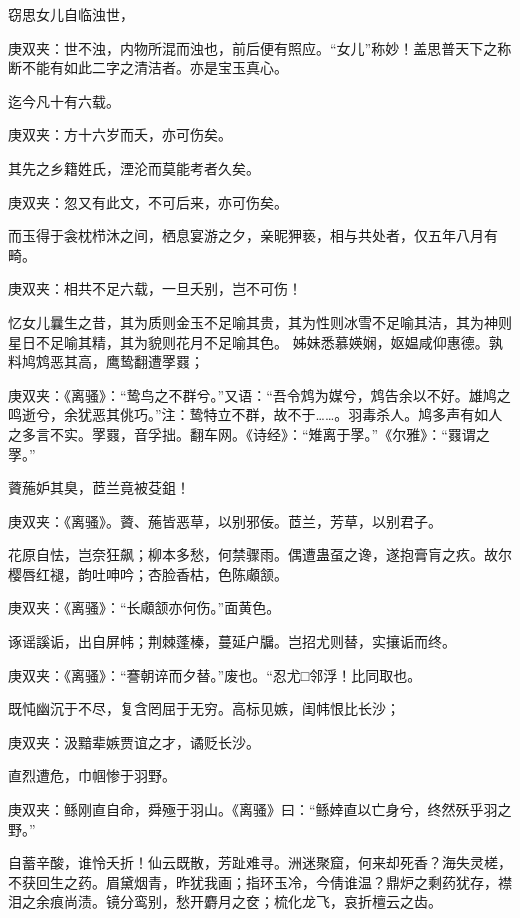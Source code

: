 \begin{qute2sp}
    \begin{parag}
        窃思女儿自临浊世，
        \begin{note}庚双夹：世不浊，内物所混而浊也，前后便有照应。“女儿”称妙！盖思普天下之称断不能有如此二字之清洁者。亦是宝玉真心。\end{note}
        迄今凡十有六载。
        \begin{note}庚双夹：方十六岁而夭，亦可伤矣。\end{note}
        其先之乡籍姓氏，湮沦而莫能考者久矣。
        \begin{note}庚双夹：忽又有此文，不可后来，亦可伤矣。\end{note}
        而玉得于衾枕栉沐之间，栖息宴游之夕，亲昵狎亵，相与共处者，仅五年八月有畸。
        \begin{note}庚双夹：相共不足六载，一旦夭别，岂不可伤！\end{note}
        忆女儿曩生之昔，其为质则金玉不足喻其贵，其为性则冰雪不足喻其洁，其为神则星日不足喻其精，其为貌则花月不足喻其色。
        姊妹悉慕媖娴，妪媪咸仰惠德。孰料鸠鸩恶其高，鹰鸷翻遭罦罬；
        \begin{note}庚双夹：《离骚》：“鸷鸟之不群兮。”又语：“吾令鸩为媒兮，鸩告余以不好。雄鸠之鸣逝兮，余犹恶其佻巧。”注：鸷特立不群，故不于……。羽毒杀人。鸠多声有如人之多言不实。罦罬，音孚拙。翻车网。《诗经》：“雉离于罦。”《尔雅》：“罬谓之罦。”\end{note}
        薋葹妒其臭，茝兰竟被芟鉏！
        \begin{note}庚双夹：《离骚》。薋、葹皆恶草，以别邪佞。茝兰，芳草，以别君子。\end{note}
        花原自怯，岂奈狂飙；柳本多愁，何禁骤雨。偶遭蛊虿之谗，遂抱膏肓之疚。故尔樱唇红褪，韵吐呻吟；杏脸香枯，色陈顑颔。
        \begin{note}庚双夹：《离骚》：“长顑颔亦何伤。”面黄色。\end{note}
        诼谣謑诟，出自屏帏；荆棘蓬榛，蔓延户牖。岂招尤则替，实攘诟而终。
        \begin{note}庚双夹：《离骚》：“謇朝谇而夕替。”废也。“忍尤□邻浮！比同取也。\end{note}
        既忳幽沉于不尽，复含罔屈于无穷。高标见嫉，闺帏恨比长沙；
        \begin{note}庚双夹：汲黯辈嫉贾谊之才，谲贬长沙。\end{note}
        直烈遭危，巾帼惨于羽野。
        \begin{note}庚双夹：鲧刚直自命，舜殛于羽山。《离骚》曰：“鲧婞直以亡身兮，终然殀乎羽之野。”\end{note}
        自蓄辛酸，谁怜夭折！仙云既散，芳趾难寻。洲迷聚窟，何来却死香？海失灵槎，不获回生之药。眉黛烟青，昨犹我画；指环玉冷，今倩谁温？鼎炉之剩药犹存，襟泪之余痕尚渍。镜分鸾别，愁开麝月之奁；梳化龙飞，哀折檀云之齿。

\end{parag}
\end{qute2sp}
